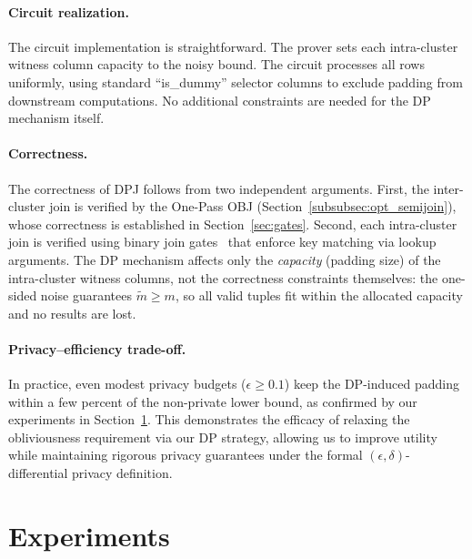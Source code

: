 \documentclass[sigconf]{acmart}
\renewcommand{\emph}[1]{\textit{#1}}
\begin{document}
\vspace{-0.1in}
\paragraph{Circuit realization.}
The circuit implementation is straightforward. The prover sets each intra-cluster witness column capacity to the noisy bound. The circuit processes all rows uniformly, using standard ``is\_dummy'' selector columns to exclude padding from downstream computations. No additional constraints are needed for the DP mechanism itself.


\vspace{-0.1in}
\paragraph{Correctness.}
The correctness of DPJ follows from two independent arguments. First, the inter-cluster join is verified by the One-Pass OBJ (Section~\ref{subsubsec:opt_semijoin}), whose correctness is established in Section~\ref{sec:gates}. Second, each intra-cluster join is verified using binary join gates~\cite{gu2025poneglyphdb} that enforce key matching via lookup arguments. The DP mechanism affects only the \emph{capacity} (padding size) of the intra-cluster witness columns, not the correctness constraints themselves: the one-sided noise guarantees $\widetilde{m} \geq m$, so all valid tuples fit within the allocated capacity and no results are lost.

\vspace{-0.1in}
\paragraph{Privacy--efficiency trade-off.}
In practice, even modest privacy budgets ($\epsilon \geq 0.1$) keep the DP-induced padding within a few percent of the non-private lower bound, as confirmed by our experiments in Section~\ref{sec:experiments}.
%
\noindent This demonstrates the efficacy of relaxing the obliviousness requirement via our DP strategy, allowing us to improve utility while maintaining rigorous privacy guarantees under the formal $(\epsilon, \delta)$-differential privacy definition.




\section{Experiments}
\label{sec:experiments}
\end{document}
